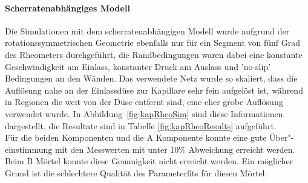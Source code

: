 \paragraph{Scherratenabhängiges Modell}
Die Simulationen mit dem scherratenabhängigen Modell wurde aufgrund der rotationssymmetrischen Geometrie ebenfalls nur für ein Segment von fünf Grad des Rheometers durchgeführt, die Randbedingungen waren dabei eine konstante Geschwindigkeit am Einlass, konstanter Druck am Auslass und 'no-slip' Bedingungen an den Wänden. 
Das verwendete Netz wurde so skaliert, dass die Auflösung nahe an der Einlassdüse zur Kapillare sehr fein aufgelöst ist, während in Regionen die weit von der Düse entfernt sind, eine eher grobe Auflösung verwendet wurde. 
In Abbildung~\ref{fig:kapRheoSim} sind diese Informationen dargestellt, die Resultate sind in Tabelle \ref{fig:kapRheoResults} aufgeführt.\\
Für die beiden \moertelB{} Komponenten und die \moertelA{} A Komponente konnte eine gute Über"-einstimmung mit den Messwerten mit unter 10\% Ab\-wei\-chung erreicht werden. Beim \moertelA{} B Mörtel konnte diese Genauigkeit nicht erreicht werden. Ein möglicher Grund ist die schlechtere Qualität des Parameterfits für diesen Mörtel.
%
